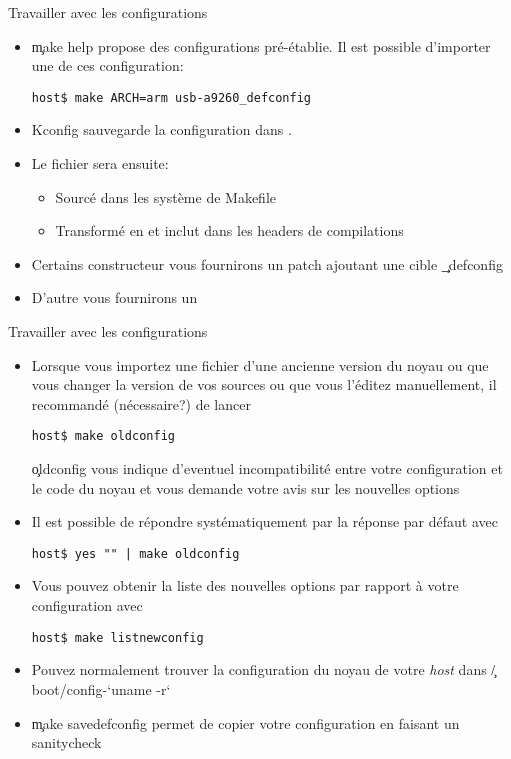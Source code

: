 \begin{frame}[fragile=singleslide]{Travailler avec les configurations}
  \begin{itemize} 
  \item \c{make  help} propose des configurations  pré-établie. Il est
    possible d'importer une de ces configuration:
    \begin{lstlisting} 
host$ make ARCH=arm usb-a9260_defconfig
    \end{lstlisting} 
  \item Kconfig sauvegarde la configuration dans . 
  \item Le fichier  sera ensuite:
    \begin{itemize} 
    \item Sourcé dans les système de Makefile
    \item Transformé  en  et inclut
      dans les headers de compilations
    \end{itemize} 
  \item Certains  constructeur vous  fournirons un patch  ajoutant une
    cible \c{_defconfig}
  \item D'autre vous fournirons un 
\end{itemize} 
\end{frame} 

\begin{frame}[fragile=singleslide]{Travailler avec les configurations}
\begin{itemize} 
  \item  Lorsque  vous   importez  une  fichier    d'une
    ancienne version  du noyau ou que  vous changer la  version de vos
    sources   ou  que  vous   l'éditez  manuellement,   il  recommandé
    (nécessaire?) de lancer
    \begin{lstlisting} 
host$ make oldconfig
    \end{lstlisting} 
    \c{oldconfig} vous indique  d'eventuel incompatibilité entre votre
    configuration et le  code du noyau et vous  demande votre avis sur
    les nouvelles options
  \item Il  est possible de  répondre systématiquement par  la réponse
    par défaut avec
    \begin{lstlisting} 
host$ yes "" | make oldconfig
    \end{lstlisting} 
  \item Vous pouvez obtenir la liste des nouvelles options par rapport
    à votre configuration avec
   \begin{lstlisting} 
host$ make listnewconfig
   \end{lstlisting} 
 \item Pouvez  normalement trouver la configuration du  noyau de votre
   \emph{host} dans \c{/boot/config-`uname -r`}
 \item \c{make  savedefconfig} permet de copier  votre configuration en
   faisant un sanitycheck
 \end{itemize}
\end{frame} 

